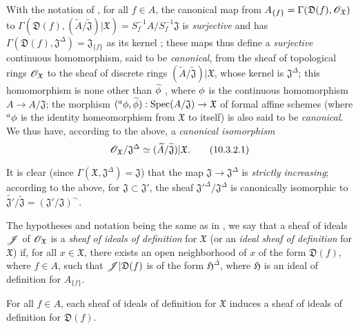 \begin{env}[10.3.2]
\label{I.10.3.2}
With the notation of , for all $f\in A$, the canonical map from $A_{\{f\}}=\Gamma(\mathfrak{D}(f),\mathscr{O}_\mathfrak{X})$ to $\Gamma(\mathfrak{D}(f),(\widetilde{A}/\widetilde{\mathfrak{J}})|\mathfrak{X})=S_f^{-1}A/S_f^{-1}\mathfrak{J}$ is \emph{surjective} and has $\Gamma(\mathfrak{D}(f),\mathfrak{J}^\Delta)=\mathfrak{J}_{\{f\}}$ as its kernel ; these maps thus define a \emph{surjective} continuous homomorphism, said to be \emph{canonical}, from the sheaf of topological rings $\mathscr{O}_\mathfrak{X}$ to the sheaf of discrete rings $(\widetilde{A}/\widetilde{\mathfrak{J}})|\mathfrak{X}$, whose kernel is $\mathfrak{J}^\Delta$; this homomorphism is none other than $\widetilde{\phi}$ , where $\phi$ is the continuous homomorphism $A\to A/\mathfrak{J}$; the morphism $({}^a\vphi,\widetilde{\vphi}):\Spec(A/\mathfrak{J})\to\mathfrak{X}$ of formal affine schemes (where ${}^a\phi$ is the identity homeomorphism from $\mathfrak{X}$ to itself) is also said to be \emph{canonical}.
We thus have, according to the above, a \emph{canonical isomorphism}
\[
\label{I.10.3.2.1}
  \mathscr{O}_\mathfrak{X}/\mathfrak{J}^\Delta\simeq(\widetilde{A}/\widetilde{\mathfrak{J}})|\mathfrak{X}.
  \tag{10.3.2.1}
\]

It is clear (since $\Gamma(\mathfrak{X},\mathfrak{J}^\Delta)=\mathfrak{J}$) that the map $\mathfrak{J}\to\mathfrak{J}^\Delta$ is \emph{strictly increasing}; according to the above, for $\mathfrak{J}\subset\mathfrak{J}'$, the sheaf ${\mathfrak{J}'}^\Delta/\mathfrak{J}^\Delta$ is canonically isomorphic to $\widetilde{\mathfrak{J}'}/\widetilde{\mathfrak{J}}=(\mathfrak{J}'/\mathfrak{J})^\sim$.
\end{env}

\begin{env}[10.3.3]
\label{I.10.3.3}
The hypotheses and notation being the same as in , we say that a sheaf of ideals $\mathscr{J}$ of $\mathscr{O}_\mathfrak{X}$ is a \emph{sheaf of ideals of definition} for $\mathfrak{X}$ (or an \emph{ideal sheaf of definition} for $\mathfrak{X}$) if, for all $x\in\mathfrak{X}$, there exists an open neighborhood of $x$ of the form $\mathfrak{D}(f)$, where $f\in A$, such that $\mathscr{J}|\mathfrak{D}(f)$ is of the form $\mathfrak{H}^\Delta$, where $\mathfrak{H}$ is an ideal of definition for $A_{\{f\}}$.
\end{env}

\begin{proposition}[10.3.4]
\label{I.10.3.4}
For all $f\in A$, each sheaf of ideals of definition for $\mathfrak{X}$ induces a sheaf of ideals of definition for $\mathfrak{D}(f)$.
\end{proposition}

